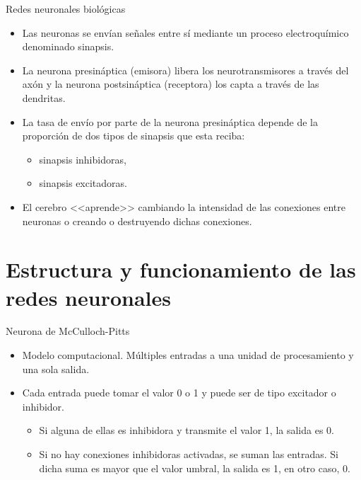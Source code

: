 \documentclass[spanish]{beamer}
\begin{document}
\begin{frame}{Redes neuronales biológicas}
  \begin{itemize}
    \item Las neuronas se envían señales entre sí mediante un proceso electroquímico denominado sinapsis.
    \item La neurona presináptica (emisora) libera los neurotransmisores a través del axón y la neurona postsináptica (receptora) los capta a través de las dendritas.
    \item La tasa de envío por parte de la neurona presináptica depende de la proporción de dos tipos de sinapsis que esta reciba: \begin{itemize}
      \item sinapsis inhibidoras,
      \item sinapsis excitadoras.
    \end{itemize}
    \item El cerebro <<aprende>> cambiando la intensidad de las conexiones entre neuronas o creando o destruyendo dichas conexiones.
  \end{itemize}
\end{frame}

\section{Estructura y funcionamiento de las redes neuronales}

\begin{frame}{Neurona de McCulloch-Pitts}
  \begin{itemize}
    \item Modelo computacional. Múltiples entradas a una unidad de procesamiento y una sola salida.
    \item Cada entrada puede tomar el valor 0 o 1 y puede ser de tipo excitador o inhibidor. \begin{itemize}
      \item Si alguna de ellas es inhibidora y transmite el valor 1, la salida es 0.
      \item Si no hay conexiones inhibidoras activadas, se suman las entradas. Si dicha suma es mayor que el valor umbral, la salida es 1, en otro caso, 0.
    \end{itemize}
  \end{itemize}
\end{frame}
\end{document}
